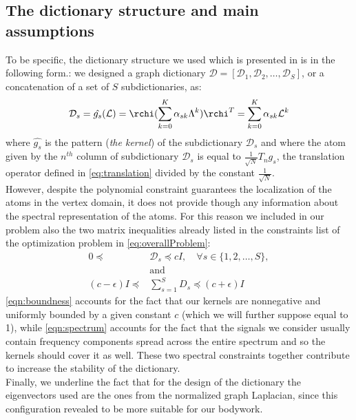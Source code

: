 \subsection{The dictionary structure and main assumptions}
To be specific, the dictionary structure we used which is presented in \cite{Thanou2014} is in the following form.: we designed a graph dictionary $\mathcal{D} = [\mathcal{D}_1, \mathcal{D}_2,\dots,\mathcal{D}_S]$, or a concatenation of a set of $S$ subdictionaries, as:
\begin{equation}
\mathcal{D}_s = \hat{g_s}(\mathcal{L}) = \rchi (\sum_{k=0}^K \alpha_{sk}\Lambda^k)\rchi^T = \sum_{k=0}^{K} \alpha_{sk}\mathcal{L}^k
\end{equation}
where $\hat{g_s}$ is the pattern (\textit{the kernel}) of the subdictionary $\mathcal{D}_s$ and where the atom given by the $n^{th}$ column of subdictionary $\mathcal{D}_s$ is equal to $\frac{1}{\sqrt{N}}T_ng_s$, the translation operator defined in \autoref{eq:translation} divided by the constant $\frac{1}{\sqrt{N}}$.\\
However, despite the polynomial constraint guarantees the localization of the atoms in the vertex domain, it does not provide though any information about the spectral representation of the atoms. For this reason we included in our problem also the two matrix inequalities already listed in the constraints list of the optimization problem in \ref{eq:overallProblem}:
\begin{align}
0 \preceq \text{ } &\mathcal{D}_s \preceq cI, \quad \forall s \in \{1,2,\dots , S\}, \label{eqn:boundness}\\
&\text{and}\\
(c-\epsilon)I \preceq &\sum_{s=1}^{S}D_s \preceq (c+\epsilon)I \label{eqn:spectrum}
\end{align}
\autoref{eqn:boundness} accounts for the fact that our kernels are nonnegative and uniformly bounded by a given constant $c$ (which we will further suppose equal to 1), while \autoref{eqn:spectrum} accounts for the fact that the signals we consider usually contain frequency components spread across the entire spectrum and so the kernels should cover it as well. These two spectral constraints together contribute to increase the stability of the dictionary.\\

Finally, we underline the fact that for the design of the dictionary the eigenvectors used are the ones from the normalized graph Laplacian, since this configuration revealed to be more suitable for our bodywork.


